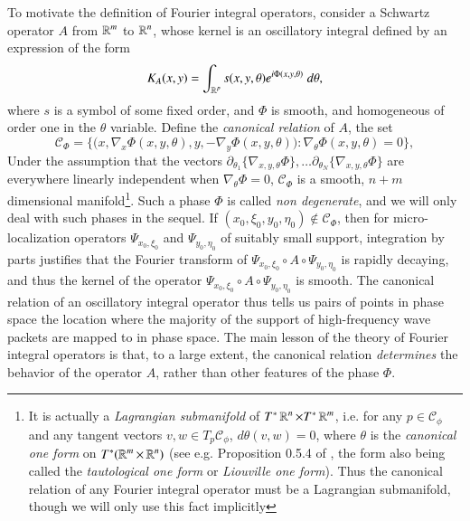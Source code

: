 To motivate the definition of Fourier integral operators, consider a Schwartz operator $A$ from $\operatorname{\mathbb{R}}^m$ to $\operatorname{\mathbb{R}}^n$, whose kernel is an oscillatory integral defined by an expression of the form
%
\begin{equation}
  K_A(x,y) = \int_{\operatorname{\mathbb{R}}^p} s(x,y,\theta) e^{i \Phi(x,y,\theta)}\; d\theta,
\end{equation}
%
where $s$ is a symbol of some fixed order, and $\Phi$ is smooth, and homogeneous of order one in the $\theta$ variable. Define the \emph{canonical relation} of $A$, the set
%
\begin{equation}
  \mathcal{C}_\Phi = \Big\{ \big(x, \nabla_x \Phi(x,y,\theta) ,y, -\nabla_y \Phi(x,y,\theta) \big) : \nabla_\theta \Phi(x,y,\theta) = 0 \Big\},
\end{equation}
%
Under the assumption that the vectors $\partial_{\theta_1} \{ \nabla_{x,y,\theta} \Phi \}, \dots \partial_{\theta_N} \{ \nabla_{x,y,\theta} \Phi \}$ are everywhere linearly independent when $\nabla_\theta \Phi = 0$, $\mathcal{C}_\Phi$ is a smooth, $n + m$ dimensional manifold\footnote{It is actually a \emph{Lagrangian submanifold} of $T^* \operatorname{\mathbb{R}}^n \times T^* \operatorname{\mathbb{R}}^m$, i.e. for any $p \in \mathcal{C}_\phi$ and any tangent vectors $v,w \in T_p \mathcal{C}_\phi$, $d\theta(v,w) = 0$, where $\theta$ is the \emph{canonical one form} on $T^*(\operatorname{\mathbb{R}}^m \times \operatorname{\mathbb{R}}^n)$ (see e.g. Proposition 0.5.4 of \cite{Sogge}, the form also being called the \emph{tautological one form} or \emph{Liouville one form}). Thus the canonical relation of any Fourier integral operator must be a Lagrangian submanifold, though we will only use this fact implicitly}. Such a phase $\Phi$ is called \emph{non degenerate}, and we will only deal with such phases in the sequel. If $(x_0,\xi_0,y_0,\eta_0) \not \in \mathcal{C}_\Phi$, then for micro-localization operators $\Psi_{x_0,\xi_0}$ and $\Psi_{y_0,\eta_0}$ of suitably small support, integration by parts justifies that the Fourier transform of $\Psi_{x_0,\xi_0} \circ A \circ \Psi_{y_0,\eta_0}$ is rapidly decaying, and thus the kernel of the operator $\Psi_{x_0,\xi_0} \circ A \circ \Psi_{y_0,\eta_0}$ is smooth. The canonical relation of an oscillatory integral operator thus tells us pairs of points in phase space the location where the majority of the support of high-frequency wave packets are mapped to in phase space. The main lesson of the theory of Fourier integral operators is that, to a large extent, the canonical relation \emph{determines} the behavior of the operator $A$, rather than other features of the phase $\Phi$.


